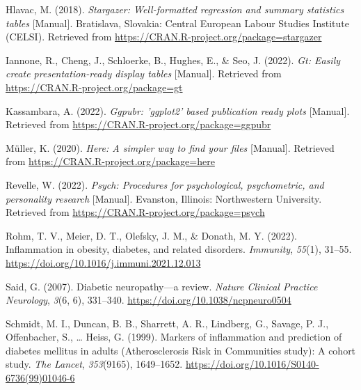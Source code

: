 \documentclass[
  man]{apa6}
\newlength{\cslhangindent}
\newlength{\cslentryspacingunit} %
\newenvironment{CSLReferences}[2] %
 {%
  \setlength{\parindent}{0pt}
  \ifodd #1
  \let\oldpar\par
  \def\par{\hangindent=\cslhangindent\oldpar}
  \fi
  \setlength{\parskip}{#2\cslentryspacingunit}
 }%
 {}
\begin{document}
\begin{CSLReferences}{1}{0}
\leavevmode{}%
Hlavac, M. (2018). \emph{Stargazer: {Well-formatted} regression and summary statistics tables} {[}Manual{]}. {Bratislava, Slovakia}: {Central European Labour Studies Institute (CELSI)}. Retrieved from \url{https://CRAN.R-project.org/package=stargazer}

\leavevmode{}%
Iannone, R., Cheng, J., Schloerke, B., Hughes, E., \& Seo, J. (2022). \emph{Gt: {Easily} create presentation-ready display tables} {[}Manual{]}. Retrieved from \url{https://CRAN.R-project.org/package=gt}

\leavevmode{}%
Kassambara, A. (2022). \emph{Ggpubr: 'ggplot2' based publication ready plots} {[}Manual{]}. Retrieved from \url{https://CRAN.R-project.org/package=ggpubr}

\leavevmode{}%
Müller, K. (2020). \emph{Here: {A} simpler way to find your files} {[}Manual{]}. Retrieved from \url{https://CRAN.R-project.org/package=here}

\leavevmode{}%
Revelle, W. (2022). \emph{Psych: {Procedures} for psychological, psychometric, and personality research} {[}Manual{]}. {Evanston, Illinois}: {Northwestern University}. Retrieved from \url{https://CRAN.R-project.org/package=psych}

\leavevmode{}%
Rohm, T. V., Meier, D. T., Olefsky, J. M., \& Donath, M. Y. (2022). Inflammation in obesity, diabetes, and related disorders. \emph{Immunity}, \emph{55}(1), 31--55. \url{https://doi.org/10.1016/j.immuni.2021.12.013}

\leavevmode{}%
Said, G. (2007). Diabetic neuropathy---a review. \emph{Nature Clinical Practice Neurology}, \emph{3}(6, 6), 331--340. \url{https://doi.org/10.1038/ncpneuro0504}

\leavevmode{}%
Schmidt, M. I., Duncan, B. B., Sharrett, A. R., Lindberg, G., Savage, P. J., Offenbacher, S., \ldots{} Heiss, G. (1999). Markers of inflammation and prediction of diabetes mellitus in adults ({Atherosclerosis Risk} in {Communities} study): A cohort study. \emph{The Lancet}, \emph{353}(9165), 1649--1652. \url{https://doi.org/10.1016/S0140-6736(99)01046-6}


\end{CSLReferences}
\end{document}
